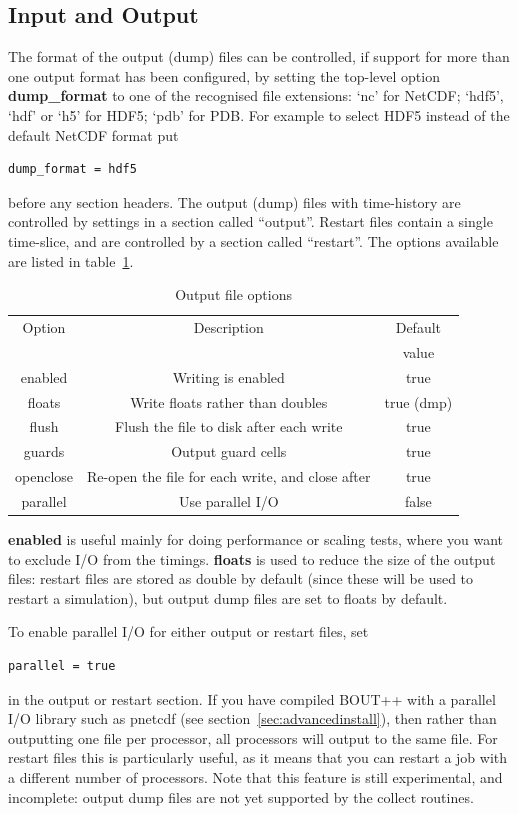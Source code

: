 \documentclass[12pt]{article}
\begin{document}
\subsection{Input and Output}
%
\label{sec:iooptions}
%
The format of the output (dump) files can be controlled, if support for more
than one output format has been configured, by setting the top-level option
{\bf dump\_format} to one of the recognised file extensions: `nc' for NetCDF;
`hdf5', `hdf' or `h5' for HDF5; `pdb' for PDB. For example to select HDF5
instead of the default NetCDF format put
%
\begin{lstlisting}
dump_format = hdf5
\end{lstlisting}
%
before any section headers.
%
The output (dump) files with time-history are controlled by settings in a
section called ``output''.  Restart files contain a single time-slice, and are
controlled by a section called ``restart''. The options available are listed in
table~\ref{tab:outputopts}.

%
\begin{table}[htb!]
\centering
\caption{Output file options}
%
\label{tab:outputopts}
%
\begin{tabular}{c | c | c}
\hline
Option & Description & Default\\
       &             & value\\
\hline
enabled & Writing is enabled & true \\
floats & Write floats rather than doubles & true (dmp)\\
flush & Flush the file to disk after each write & true \\
guards & Output guard cells & true \\
openclose & Re-open the file for each write, and close after & true \\
parallel & Use parallel I/O & false \\
\hline
\end{tabular}
%
\end{table}
%
{\bf enabled} is useful mainly for doing performance or scaling tests, where
you want to exclude I/O from the timings. {\bf floats} is used to reduce the
size of the output files: restart files are stored as double by default (since
these will be used to restart a simulation), but output dump files are set to
floats by default.

To enable parallel I/O for either output or restart files, set
%
\begin{lstlisting}
parallel = true
\end{lstlisting}
%
in the output or restart section. If you have compiled BOUT++ with a parallel
I/O library such as pnetcdf (see section~\ref{sec:advancedinstall}), then
rather than outputting one file per processor, all processors will output to
the same file. For restart files this is particularly useful, as it means that
you can restart a job with a different number of processors.  Note that this
feature is still experimental, and incomplete: output dump files are not yet
supported by the collect routines.
\end{document}
